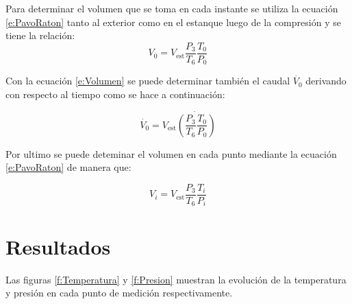 \documentclass[11pt,letterpaper]{extarticle}        %
\numberwithin{equation}{section}                    %
\begin{document}
Para determinar el volumen que se toma en cada instante se utiliza la ecuación \ref{e:PavoRaton} tanto al exterior como en el estanque luego de la compresión y se tiene la relación:
\begin{equation}
V_{0} = V_{\text{est}} \frac{P_3}{T_6} \frac{T_0}{P_0}
\label{e:Volumen}
\end{equation}

Con la ecuación \ref{e:Volumen} se puede determinar también el caudal $\dot{V_0}$ derivando con respecto al tiempo como se hace a continuación:

\begin{equation}
\dot{V_0} = V_{\text{est}}\dot{
\left( \frac{P_3}{T_6} 
\frac{T_0}{P_0}
\right)}
\label{e:Caudal}
\end{equation} 

Por ultimo se puede deteminar el volumen en cada punto mediante la ecuación \ref{e:PavoRaton} de manera que:

\begin{equation}
V_i = V_{\text{est}} \frac{P_3}{T_6} \frac{T_i}{P_i}
\end{equation}
\newpage
\section{Resultados}

Las figuras \ref{f:Temperatura} y \ref{f:Presion} muestran la evolución de la temperatura y presión en cada punto de medición respectivamente.
\end{document}
